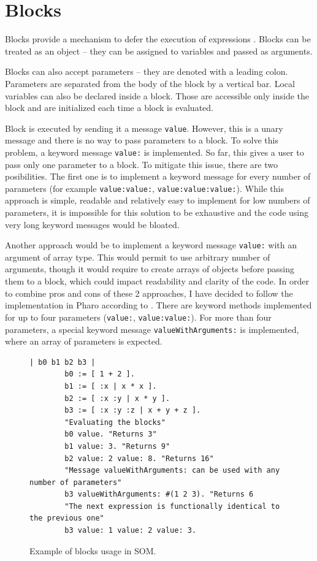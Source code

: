 \documentclass[thesis=M,english]{FITthesis}[2019/12/23]
\begin{document}
\section{Blocks}
Blocks provide a mechanism to defer the execution of expressions \cite{pharo-by-example}.
Blocks can be treated as an object -- they can be assigned to variables and
passed as arguments. 

Blocks can also accept parameters -- they are denoted with a leading colon. Parameters are separated from the body
of the block by a vertical bar. Local variables can also be declared inside a block. Those are accessible only inside
the block and are initialized each time a block is evaluated.

Block is executed by sending it a message \texttt{value}. However, this is a unary message and there is no way
to pass parameters to a block. To solve this problem, a keyword message \texttt{value:} is implemented. So far, this
gives a user to pass only one parameter to a block. To mitigate this issue, there are two posibilities. The first one
is to implement a keyword message for every number of parameters (for example \texttt{value:value:}, 
\texttt{value:value:value:}). While this approach is simple, readable and relatively easy to implement for low
numbers of parameters, it is impossible for this solution to be exhaustive and the code using very long keyword
messages would be bloated.

Another approach would be to implement a keyword message \texttt{value:} with an argument of array type. This would
permit to use arbitrary number of arguments, though it would require to create arrays of objects before passing them
to a block, which could impact readability and clarity of the code. In order to combine pros and cons of these 2
approaches, I have decided to follow the implementation in Pharo according to \cite[p.~65]{pharo-by-example}. 
There are keyword methods implemented for up to four parameters (\texttt{value:}, \texttt{value:value:}). For more
than four parameters, a special keyword message \texttt{valueWithArguments:} is implemented, where an array of
parameters is expected.

\begin{figure}
	\caption{Example of blocks usage in SOM.}
	\begin{lstlisting}[language=Smalltalk]
		| b0 b1 b2 b3 |
		b0 := [ 1 + 2 ].
		b1 := [ :x | x * x ].
		b2 := [ :x :y | x * y ].
		b3 := [ :x :y :z | x + y + z ].
		"Evaluating the blocks"
		b0 value. "Returns 3"
		b1 value: 3. "Returns 9"
		b2 value: 2 value: 8. "Returns 16"
		"Message valueWithArguments: can be used with any number of parameters"
		b3 valueWithArguments: #(1 2 3). "Returns 6
		"The next expression is functionally identical to the previous one"
		b3 value: 1 value: 2 value: 3.
	\end{lstlisting}
\end{figure}
\end{document}
